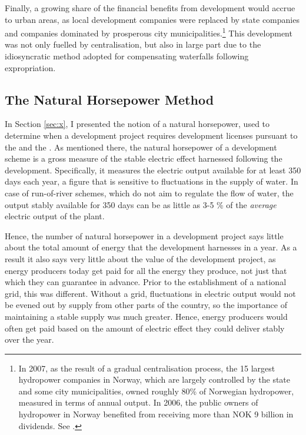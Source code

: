Finally, a growing share of the financial benefits from development would accrue to urban areas, as local development companies were replaced by state companies and companies dominated by prosperous city municipalities.\footnote{In 2007, as the result of a gradual centralisation process, the 15 largest hydropower companies in Norway, which are largely controlled by the state and some city municipalities, owned roughly 80\% of Norwegian hydropower, measured in terms of annual output. In 2006, the public owners of hydropower in Norway benefited from receiving more than NOK 9 billion in dividends. See \cite[28]{otprp61}.} This development was not only fuelled by centralisation, but also in large part due to the idiosyncratic method adopted for compensating waterfalls following expropriation.

\subsection{The Natural Horsepower Method}

In Section \ref{sec:x}, I presented the notion of a natural horsepower, used to determine when a development project requires development licenses pursuant to the \cite{wra17} and the \cite{ica17}. As mentioned there, the natural horsepower of a development scheme is a gross measure of the stable electric effect harnessed following the development. Specifically, it measures the electric output available for at least 350 days each year, a figure that is sensitive to fluctuations in the supply of water. In case of run-of-river schemes, which do not aim to regulate the flow of water, the output stably available for 350 days can be as little as 3-5 \% of the {\it average} electric output of the plant. 

Hence, the number of natural horsepower in a development project says little about the total amount of energy that the development harnesses in a year. As a result it also says very little about the value of the development project, as energy producers today get paid for all the energy they produce, not just that which they can guarantee in advance. Prior to the establishment of a national grid, this was different. Without a grid, fluctuations in electric output would not be evened out by supply from other parts of the country, so the importance of maintaining a stable supply was much greater. Hence, energy producers would often get paid based on the amount of electric effect they could deliver stably over the year.

